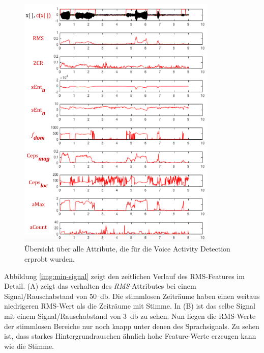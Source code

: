 \begin{figure}[h]
	\centering
	\includegraphics[width=0.85\textwidth]{bilder/allFeatures01.png}
	\caption[Übersicht über alle Attribute, die für die Voice Activity Detection erprobt wurden]{Übersicht über alle Attribute, die für die Voice Activity Detection erprobt wurden.}
	\label{img:vadAllFeatures}
\end{figure}

Abbildung \ref{img:min-signal} zeigt den zeitlichen Verlauf des RMS-Features im Detail. (A) zeigt das verhalten des \emph{RMS}-Attributes bei einem Signal/Rauschabstand von \SI{50}{\decibel}. Die stimmlosen Zeiträume haben einen weitaus niedrigeren RMS-Wert als die Zeiträume mit Stimme. In (B) ist das selbe Signal mit einem Signal/Rauschabstand von \SI{3}{\decibel} zu sehen. Nun liegen die RMS-Werte der stimmlosen Bereiche nur noch knapp unter denen des Sprachsignals. Zu sehen ist, dass starkes Hintergrundrauschen ähnlich hohe Feature-Werte erzeugen kann wie die Stimme.

